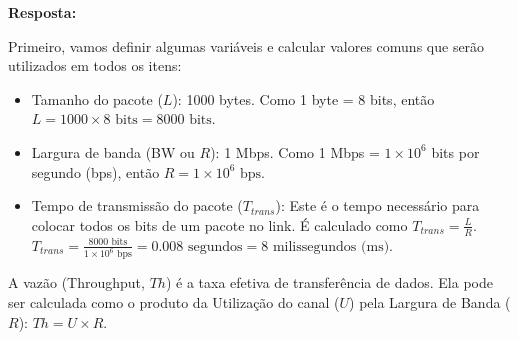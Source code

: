 \noindent
\textbf{Resposta:}

Primeiro, vamos definir algumas variáveis e calcular valores comuns que serão utilizados em todos os itens:
\begin{itemize}
    \item Tamanho do pacote ($L$): 1000 bytes.
    Como 1 byte = 8 bits, então $L = 1000 \times 8 \text{ bits} = 8000 \text{ bits}$.
    \item Largura de banda (BW ou $R$): 1 Mbps.
    Como 1 Mbps = $1 \times 10^6$ bits por segundo (bps), então $R = 1 \times 10^6 \text{ bps}$.
    \item Tempo de transmissão do pacote ($T_{trans}$):
    Este é o tempo necessário para colocar todos os bits de um pacote no link.
    É calculado como $T_{trans} = \frac{L}{R}$.
    $T_{trans} = \frac{8000 \text{ bits}}{1 \times 10^6 \text{ bps}} = 0.008 \text{ segundos} = 8 \text{ milissegundos (ms)}$.
\end{itemize}
A vazão (Throughput, $Th$) é a taxa efetiva de transferência de dados. Ela pode ser calculada como o produto da Utilização do canal ($U$) pela Largura de Banda ($R$): $Th = U \times R$.

\vspace{0.5cm} %

